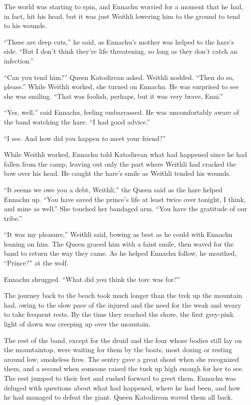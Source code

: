The world was starting to spin, and Ennachu worried for a moment that he had, in fact, hit his head, but it was just Weithli lowering him to the ground to tend to his wounds.

``These are deep cuts,'' he said, as Ennachu's mother was helped to the hare's side. ``But I don't think they're life threatening, so long as they don't catch an infection.''

``Can you tend him?'' Queen Katodirean asked. Weithli nodded. ``Then do so, please.'' While Weithli worked, she turned on Ennachu. He was surprised to see she was smiling. ``That was foolish, perhaps, but it was very brave, Enni.''

``Yes, well,'' said Ennachu, feeling embarrassed. He was uncomfortably aware of the band watching the hare. ``I had good advice.''

``I see. And how did you happen to meet your friend?''

While Weithli worked, Ennachu told Katodirean what had happened since he had fallen from the camp, leaving out only the part where Weithli had cracked the bow over his head. He caught the hare's smile as Weithli tended his wounds.

``It seems we owe you a debt, Weithli,'' the Queen said as the hare helped Ennachu up. ``You have saved the prince's life at least twice over tonight, I think, and mine as well.'' She touched her bandaged arm. ``You have the gratitude of our tribe.''

``It was my pleasure,'' Weithli said, bowing as best as he could with Ennachu leaning on him. The Queen graced him with a faint smile, then waved for the band to return the way they came. As he helped Ennachu follow, he mouthed, ``Prince?'' at the wolf.

Ennachu shrugged. ``What did you think the torc was for?''

The journey back to the beach took much longer than the trek up the mountain had, owing to the slow pace of the injured and the need for the weak and weary to take frequent rests. By the time they reached the shore, the first grey-pink light of dawn was creeping up over the mountain.

The rest of the band, except for the druid and the four whose bodies still lay on the mountaintop, were waiting for them by the boats, most dozing or resting around low, smokeless fires. The sentry gave a great shout when she recognized them, and a second when someone raised the tusk up high enough for her to see. The rest jumped to their feet and rushed forward to greet them. Ennachu was deluged with questions about what had happened, where he had been, and how he had managed to defeat the giant. Queen Katodirean waved them all back.

